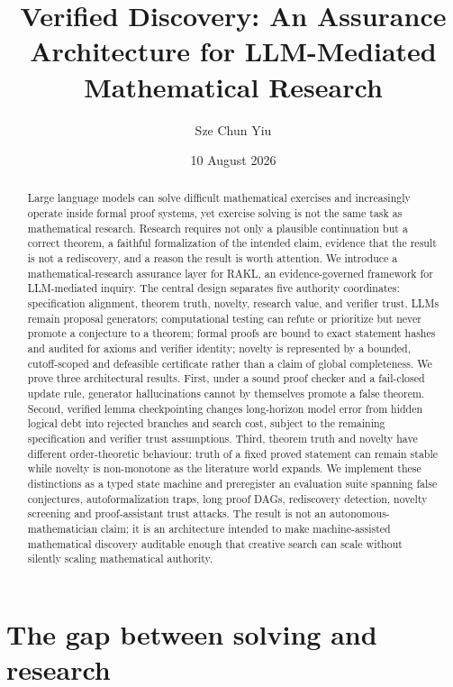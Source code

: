 \documentclass[11pt]{article}
\title{Verified Discovery: An Assurance Architecture for LLM-Mediated Mathematical Research}
\author{Sze Chun Yiu}
\date{10 August 2026}
\newcommand{\RAKL}{\textsc{RAKL}}
\begin{document}
\maketitle

\begin{abstract}
Large language models can solve difficult mathematical exercises and increasingly operate inside formal proof systems, yet exercise solving is not the same task as mathematical research. Research requires not only a plausible continuation but a correct theorem, a faithful formalization of the intended claim, evidence that the result is not a rediscovery, and a reason the result is worth attention. We introduce a mathematical-research assurance layer for \RAKL{}, an evidence-governed framework for LLM-mediated inquiry. The central design separates five authority coordinates: specification alignment, theorem truth, novelty, research value, and verifier trust. LLMs remain proposal generators; computational testing can refute or prioritize but never promote a conjecture to a theorem; formal proofs are bound to exact statement hashes and audited for axioms and verifier identity; novelty is represented by a bounded, cutoff-scoped and defeasible certificate rather than a claim of global completeness. We prove three architectural results. First, under a sound proof checker and a fail-closed update rule, generator hallucinations cannot by themselves promote a false theorem. Second, verified lemma checkpointing changes long-horizon model error from hidden logical debt into rejected branches and search cost, subject to the remaining specification and verifier trust assumptions. Third, theorem truth and novelty have different order-theoretic behaviour: truth of a fixed proved statement can remain stable while novelty is non-monotone as the literature world expands. We implement these distinctions as a typed state machine and preregister an evaluation suite spanning false conjectures, autoformalization traps, long proof DAGs, rediscovery detection, novelty screening and proof-assistant trust attacks. The result is not an autonomous-mathematician claim; it is an architecture intended to make machine-assisted mathematical discovery auditable enough that creative search can scale without silently scaling mathematical authority.
\end{abstract}

\section{The gap between solving and research}
\end{document}
